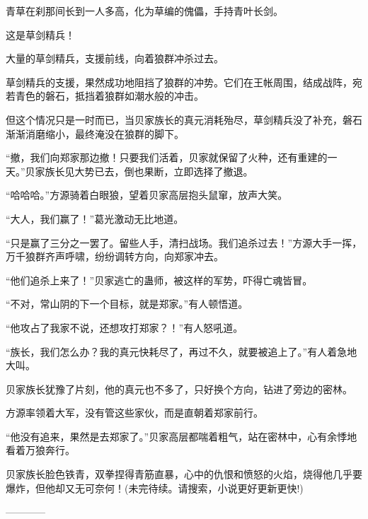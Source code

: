 \begin{this_body}
青草在刹那间长到一人多高，化为草编的傀儡，手持青叶长剑。

这是草剑精兵！

大量的草剑精兵，支援前线，向着狼群冲杀过去。

草剑精兵的支援，果然成功地阻挡了狼群的冲势。它们在王帐周围，结成战阵，宛若青色的磐石，抵挡着狼群如潮水般的冲击。

但这个情况只是一时而已，当贝家族长的真元消耗殆尽，草剑精兵没了补充，磐石渐渐消磨缩小，最终淹没在狼群的脚下。

“撤，我们向郑家那边撤！只要我们活着，贝家就保留了火种，还有重建的一天。”贝家族长见大势已去，倒也果断，立即选择了撤退。

“哈哈哈。”方源骑着白眼狼，望着贝家高层抱头鼠窜，放声大笑。

“大人，我们赢了！”葛光激动无比地道。

“只是赢了三分之一罢了。留些人手，清扫战场。我们追杀过去！”方源大手一挥，万千狼群齐声呼啸，纷纷调转方向，向郑家冲去。

“他们追杀上来了！”贝家逃亡的蛊师，被这样的军势，吓得亡魂皆冒。

“不对，常山阴的下一个目标，就是郑家。”有人顿悟道。

“他攻占了我家不说，还想攻打郑家？！”有人怒吼道。

“族长，我们怎么办？我的真元快耗尽了，再过不久，就要被追上了。”有人着急地大叫。

贝家族长犹豫了片刻，他的真元也不多了，只好换个方向，钻进了旁边的密林。

方源率领着大军，没有管这些家伙，而是直朝着郑家前行。

“他没有追来，果然是去郑家了。”贝家高层都喘着粗气，站在密林中，心有余悸地看着万狼奔行。

贝家族长脸色铁青，双拳捏得青筋直暴，心中的仇恨和愤怒的火焰，烧得他几乎要爆炸，但他却又无可奈何！(未完待续。请搜索，小说更好更新更快!)

------------

\end{this_body}

